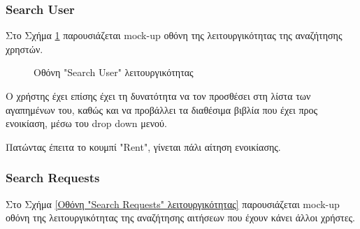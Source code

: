 \documentclass[12pt,a4paper]{article}
\begin{document}
\subsubsection{Search User}

Στο Σχήμα \ref{Οθόνη "Search User" λειτουργικότητας} παρουσιάζεται mock-up οθόνη της λειτουργικότητας της αναζήτησης χρηστών.

\begin{figure}[H]
	\caption{Οθόνη "Search User" λειτουργικότητας}
	\label{Οθόνη "Search User" λειτουργικότητας}
\end{figure}

Ο χρήστης έχει επίσης έχει τη δυνατότητα να τον προσθέσει στη λίστα των αγαπημένων του, καθώς και να προβάλλει τα διαθέσιμα βιβλία που έχει προς ενοικίαση, μέσω του drop down μενού. 

Πατώντας έπειτα το κουμπί "Rent", γίνεται πάλι αίτηση ενοικίασης.

\subsubsection{Search Requests}

Στο Σχήμα \ref{Οθόνη "Search Requests" λειτουργικότητας} παρουσιάζεται mock-up οθόνη της λειτουργικότητας της αναζήτησης αιτήσεων που έχουν κάνει άλλοι χρήστες.
\end{document}

